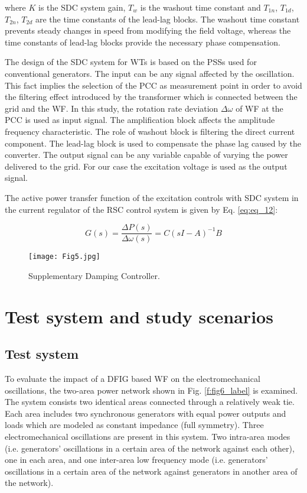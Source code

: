 \documentclass[conference,11pt]{IEEEtran}
\begin{document}
{\setlength{\parindent}{0cm}
where $K$ is the SDC system gain, $T_w$ is the washout time constant and $T_{1n}$, $T_{1d}$, $T_{2n}$, $T_{2d}$ are the time constants of the lead-lag blocks. The washout time constant prevents steady changes in speed from modifying the field voltage, whereas the time constants of lead-lag blocks provide the necessary phase compensation.}

The design of the SDC system for WTs is based on the PSSs used for conventional generators. The input can be any signal affected by the oscillation. This fact implies the selection of the PCC as measurement point in order to avoid the filtering effect introduced by the transformer which is connected between the grid and the WF. In this study, the rotation rate deviation $\Delta\omega$ of WF at the PCC is used as input signal. The amplification block affects the amplitude frequency characteristic. The role of washout block is filtering the direct current component. The lead-lag block is used to compensate the phase lag caused by the converter. The output signal can be any variable capable of varying the power delivered to the grid. For our case the excitation voltage is used as the output signal. 

The active power transfer function of the excitation controls with SDC system in the current regulator of the RSC control system is given by Eq. \ref{eq:eq_12}:

\begin{equation}
    \label{eq:eq_12}
   G(s) = \dfrac{\Delta P(s)}{\Delta \omega (s)} = C (sI - A)^{-1}B
\end{equation}

\begin{figure}[t]
  \centering
  \texttt{[image: Fig5.jpg]}
  \caption{Supplementary Damping Controller.}
  \label{f:fig5_label}
\end{figure} 


\section{Test system and study scenarios}\label{s:system}


\subsection{Test system}\label{ss:test_system}
To evaluate the impact of a DFIG based WF on the electromechanical oscillations, the two-area power network shown in Fig. \ref{f:fig6_label} \cite{ref21} is examined. The system consists two identical areas connected through a relatively weak tie. Each area includes two synchronous generators with equal power outputs and loads which are modeled as constant impedance (full symmetry). Three electromechanical oscillations are present in this system. Two intra-area modes (i.e. generators' oscillations in a certain area of the network against each other), one in each area, and one inter-area low frequency mode (i.e. generators' oscillations in a certain area of the network against generators in another area of the network). 
\end{document}
